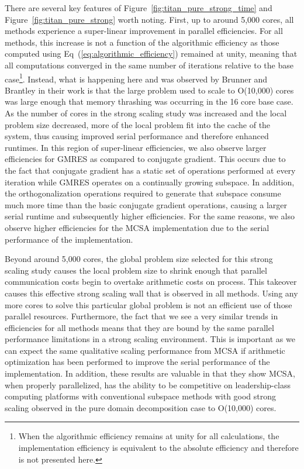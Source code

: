 There are several key features of
Figure~\ref{fig:titan_pure_strong_time} and
Figure~\ref{fig:titan_pure_strong} worth noting. First, up to around
5,000 cores, all methods experience a super-linear improvement in
parallel efficiencies. For all methods, this increase is not a
function of the algorithmic efficiency as those computed using
Eq~(\ref{eq:algorithmic_efficiency}) remained at unity, meaning that
all computations converged in the same number of iterations relative
to the base case\footnote{When the algorithmic efficiency remains at
  unity for all calculations, the implementation efficiency is
  equivalent to the absolute efficiency and therefore is not presented
  here.}. Instead, what is happening here and was observed by Brunner
and Brantley in their work is that the large problem used to scale to
O(10,000) cores was large enough that memory thrashing was occurring
in the 16 core base case. As the number of cores in the strong scaling
study was increased and the local problem size decreased, more of the
local problem fit into the cache of the system, thus causing improved
serial performance and therefore enhanced runtimes. In this region of
super-linear efficiencies, we also observe larger efficiencies for
GMRES as compared to conjugate gradient. This occurs due to the fact
that conjugate gradient has a static set of operations performed at
every iteration while GMRES operates on a continually growing
subspace. In addition, the orthogonalization operations required to
generate that subspace consume much more time than the basic conjugate
gradient operations, causing a larger serial runtime and subsequently
higher efficiencies. For the same reasons, we also observe higher
efficiencies for the MCSA implementation due to the serial performance
of the implementation.

Beyond around 5,000 cores, the global problem size selected for this
strong scaling study causes the local problem size to shrink enough
that parallel communication costs begin to overtake arithmetic costs
on process. This takeover causes this effective strong scaling wall
that is observed in all methods. Using any more cores to solve this
particular global problem is not an efficient use of those parallel
resources. Furthermore, the fact that we see a very similar trends in
efficiencies for all methods means that they are bound by the same
parallel performance limitations in a strong scaling environment. This
is important as we can expect the same qualitative scaling performance
from MCSA if arithmetic optimization has been performed to improve the
serial performance of the implementation. In addition, these results
are valuable in that they show MCSA, when properly parallelized, has
the ability to be competitive on leadership-class computing platforms
with conventional subspace methods with good strong scaling observed
in the pure domain decomposition case to O(10,000) cores.

